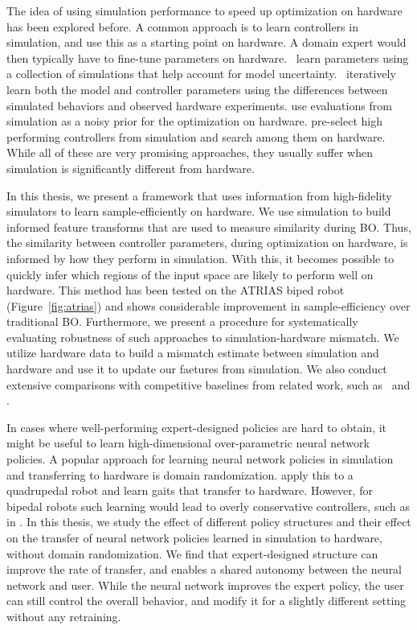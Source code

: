 The idea of using simulation performance to speed up optimization on hardware has been explored before. A common approach is to learn controllers in simulation, and use this as a starting point on hardware. A domain expert would then typically have to fine-tune parameters on hardware. \cite{mordatch2015ensemble}~learn parameters using a collection of simulations that help account for model uncertainty. \cite{ha2015reducing}~iteratively learn both the model and controller parameters using the differences between simulated behaviors and observed hardware experiments. \cite{wilson2014using} use evaluations from simulation as a noisy prior for the optimization on hardware. \cite{cully2015robots} pre-select high performing controllers from simulation and search among them on hardware. While all of these are very promising approaches, they usually suffer when simulation is significantly different from hardware.
 
In this thesis, we present a framework that uses information from high-fidelity simulators to learn sample-efficiently on hardware. We use simulation to build informed feature transforms that are used to measure similarity during BO. Thus, the similarity between controller parameters, during optimization on hardware, is informed by how they perform in simulation. With this, it becomes possible to quickly infer which regions of the input space are likely to perform well on hardware. This method has been tested on the ATRIAS biped robot (Figure~\ref{fig:atrias}) and shows considerable improvement in sample-efficiency over traditional BO. Furthermore, we present a procedure for systematically evaluating robustness of such approaches to simulation-hardware mismatch. We utilize hardware data to build a mismatch estimate between simulation and hardware and use it to update our faetures from simulation. We also conduct extensive comparisons with competitive baselines from related work, such as~\cite{cully2015robots} and \cite{wilson2014using}. 

In cases where well-performing expert-designed policies are hard to obtain, it might be useful to learn high-dimensional over-parametric neural network policies. A popular approach for learning neural network policies in simulation and transferring to hardware is domain randomization. \cite{tan2018sim} apply this to a quadrupedal robot and learn gaits that transfer to hardware. However, for bipedal robots such learning would lead to overly conservative controllers, such as in \cite{mordatch2015ensemble}. In this thesis, we study the effect of different policy structures and their effect on the transfer of neural network policies learned in simulation to hardware, without domain randomization. We find that expert-designed structure can improve the rate of transfer, and enables a shared autonomy between the neural network and user. While the neural network improves the expert policy, the user can still control the overall behavior, and modify it for a slightly different setting without any retraining.

